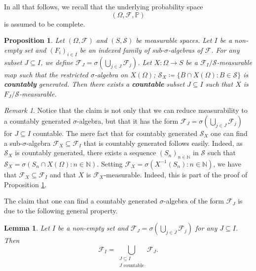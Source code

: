 \documentclass[11pt,a4paper,twoside,openany]{report}
\numberwithin{equation}{section}
\theoremstyle{plain} %
\newtheorem{proposition}[theorem]{Proposition}
\newtheorem{lemma}[theorem]{Lemma}
\theoremstyle{definition} %
\theoremstyle{remark} %
\newtheorem{remark}[theorem]{Remark}
\begin{document}
 
 In all that follows, we recall that the underlying probability space 
 \begin{equation*}
     (\Omega,\mathcal{F},\mathbb{P})
 \end{equation*}
 is assumed to be complete.
 \begin{proposition}\label{prop:reduction to countable measurability}
     Let \((\Omega,\mathcal{F})\) and \((S,\mathcal{S})\) be measurable spaces. Let \(I\) be a non-empty set and \((F_i)_{i\in I}\) be an indexed family of sub-\(\sigma\)-algebras of \(\mathcal{F}\). For any subset \(J\subseteq I\), we define \(\mathcal{F}_J=\sigma(\bigcup_{j\in J}\mathcal{F}_j)\). Let \(X:\Omega\to S\) be a \(\mathcal{F}_I/\mathcal{S}\)-measurable map such that the restricted \(\sigma\)-algebra on \(X(\Omega)\); \(\mathcal{S}_X\coloneqq\{B\cap X(\Omega):B\in \mathcal{S}\}\) is \textbf{countably} generated. Then there exists a \textbf{countable} subset \(J\subseteq I\) such that \(X\) is \(F_{J}/\mathcal{S}\)-measurable. 
 \end{proposition}
 \begin{remark}\label{Remark:countably generated sigma algebra}
      Notice that the claim is not only that we can reduce measurability to a countably generated \(\sigma\)-algebra, but that it has the form \(\mathcal{F}_J=\sigma(\bigcup_{j\in J}\mathcal{F}_j)\) for \(J\subseteq I\) countable. The mere fact that for countably generated \(\mathcal{S}_X\) one can find a sub-\(\sigma\)-algebra \(\mathcal{F}_X\subseteq\mathcal{F}_I\) that is countably generated follows easily. Indeed, as \(\mathcal{S}_X\) is countably generated, there exists a sequence \((S_n)_{n\in\mathbb{N}}\) in \(\mathcal{S}\) such that \(\mathcal{S}_X=\sigma(S_n\cap X(\Omega):n\in\mathbb{N})\). Setting 
 \(\mathcal{F}_X=\sigma(X^{-1}(S_n):n\in\mathbb{N})\), we have that \(\mathcal{F}_X\subseteq\mathcal{F}_I\) and that \(X\) is \(\mathcal{F}_X\)-measurable. Indeed, this is part of the proof of Proposition \ref{prop:reduction to countable measurability}. 
 \end{remark}
The claim that one can find a countably generated \(\sigma\)-algebra of the form \(\mathcal{F}_J\) is  due to the following general property.
 \begin{lemma}\label{lemma:reduction to countable measurability}
     Let \(I\) be a non-empty set and \(\mathcal{F}_J=\sigma(\bigcup_{j\in J}\mathcal{F}_j)\) for any \(J\subseteq I\). Then 
     \begin{equation}\label{eq:reduction to countable measurability}
         \mathcal{F}_I=\bigcup_{\substack{J\subseteq I\\ J\text{ countable}}}\mathcal{F}_J.
     \end{equation}
 \end{lemma}
\end{document}
